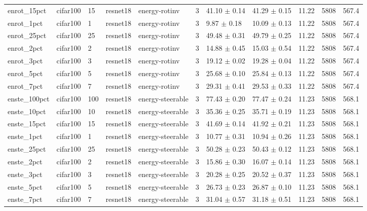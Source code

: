\begin{tabular}{lllllllllll}
enrot_15pct & cifar100 & 15 & resnet18 & energy-rotinv & 3 & 41.10 $\pm$ 0.14 & 41.29 $\pm$ 0.15 & 11.22 & 5808 & 567.4 \\
enrot_1pct & cifar100 & 1 & resnet18 & energy-rotinv & 3 & 9.87 $\pm$ 0.18 & 10.09 $\pm$ 0.13 & 11.22 & 5808 & 567.4 \\
enrot_25pct & cifar100 & 25 & resnet18 & energy-rotinv & 3 & 49.48 $\pm$ 0.31 & 49.79 $\pm$ 0.25 & 11.22 & 5808 & 567.4 \\
enrot_2pct & cifar100 & 2 & resnet18 & energy-rotinv & 3 & 14.88 $\pm$ 0.45 & 15.03 $\pm$ 0.54 & 11.22 & 5808 & 567.4 \\
enrot_3pct & cifar100 & 3 & resnet18 & energy-rotinv & 3 & 19.12 $\pm$ 0.02 & 19.28 $\pm$ 0.04 & 11.22 & 5808 & 567.4 \\
enrot_5pct & cifar100 & 5 & resnet18 & energy-rotinv & 3 & 25.68 $\pm$ 0.10 & 25.84 $\pm$ 0.13 & 11.22 & 5808 & 567.4 \\
enrot_7pct & cifar100 & 7 & resnet18 & energy-rotinv & 3 & 29.31 $\pm$ 0.41 & 29.53 $\pm$ 0.33 & 11.22 & 5808 & 567.4 \\
enste_100pct & cifar100 & 100 & resnet18 & energy-steerable & 3 & 77.43 $\pm$ 0.20 & 77.47 $\pm$ 0.24 & 11.23 & 5808 & 568.1 \\
enste_10pct & cifar100 & 10 & resnet18 & energy-steerable & 3 & 35.36 $\pm$ 0.25 & 35.71 $\pm$ 0.19 & 11.23 & 5808 & 568.1 \\
enste_15pct & cifar100 & 15 & resnet18 & energy-steerable & 3 & 41.69 $\pm$ 0.14 & 41.92 $\pm$ 0.21 & 11.23 & 5808 & 568.1 \\
enste_1pct & cifar100 & 1 & resnet18 & energy-steerable & 3 & 10.77 $\pm$ 0.31 & 10.94 $\pm$ 0.26 & 11.23 & 5808 & 568.1 \\
enste_25pct & cifar100 & 25 & resnet18 & energy-steerable & 3 & 50.28 $\pm$ 0.23 & 50.43 $\pm$ 0.12 & 11.23 & 5808 & 568.1 \\
enste_2pct & cifar100 & 2 & resnet18 & energy-steerable & 3 & 15.86 $\pm$ 0.30 & 16.07 $\pm$ 0.14 & 11.23 & 5808 & 568.1 \\
enste_3pct & cifar100 & 3 & resnet18 & energy-steerable & 3 & 20.28 $\pm$ 0.25 & 20.52 $\pm$ 0.37 & 11.23 & 5808 & 568.1 \\
enste_5pct & cifar100 & 5 & resnet18 & energy-steerable & 3 & 26.73 $\pm$ 0.23 & 26.87 $\pm$ 0.10 & 11.23 & 5808 & 568.1 \\
enste_7pct & cifar100 & 7 & resnet18 & energy-steerable & 3 & 31.04 $\pm$ 0.57 & 31.18 $\pm$ 0.51 & 11.23 & 5808 & 568.1 \\

\end{tabular}
